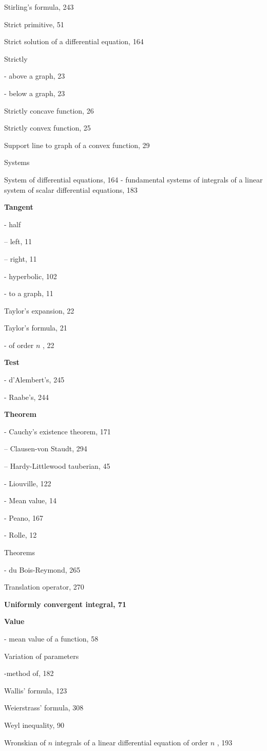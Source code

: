 Stirling's formula, 243

Strict primitive, 51

Strict solution of a differential equation, 164

Strictly

- above a graph, 23

- below a graph, 23

Strictly concave function, 26

Strictly convex function, 25

Support line to graph of a convex function, 29

Systems

System of differential equations, 164 - fundamental systems of integrals of a linear system of scalar differential equations, 183

\par\noindent\textbf{Tangent}\par

- half

-- left, 11

-- right, 11

- hyperbolic, 102

- to a graph, 11

Taylor's expansion, 22

Taylor's formula, 21

- of order \(n\) , 22

\par\noindent\textbf{Test}\par

- d'Alembert's, 245

- Raabe's, 244

\par\noindent\textbf{Theorem}\par

- Cauchy's existence theorem, 171

-- Clausen-von Staudt, 294

-- Hardy-Littlewood tauberian, 45

- Liouville, 122

- Mean value, 14

- Peano, 167

- Rolle, 12

Theorems

- du Bois-Reymond, 265

Translation operator, 270

\par\noindent\textbf{Uniformly convergent integral, 71}\par

\par\noindent\textbf{Value}\par

- mean value of a function, 58

Variation of parameters

-method of, 182

Wallis' formula, 123

Weierstrass' formula, 308

Weyl inequality, 90

Wronskian of \(n\) integrals of a linear differential equation of order \(n\) , 193
